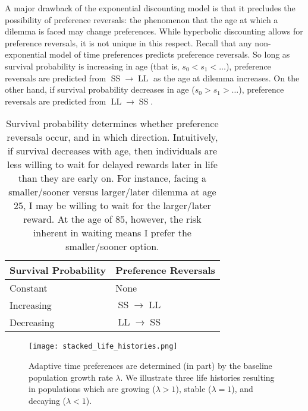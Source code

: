 \documentclass[titlepage, hidelinks, 12pt]{article}
\theoremstyle{plain}
\theoremstyle{remark}
\theoremstyle{definition}
\DeclareMathOperator{\smallersooner}{SS}
\DeclareMathOperator{\largerlater}{LL}
\begin{document}
A major drawback of the exponential discounting model is that it precludes the possibility of preference reversals: the phenomenon that the
age at which a dilemma is faced may change preferences. While hyperbolic discounting allows for preference reversals, it is not unique in 
this respect. Recall that any
non-exponential model of time preferences predicts preference reversals. 
So long as survival probability is increasing in age (that is, $s_0 < s_1 < \ldots$), preference reversals are predicted from $\smallersooner\to
\largerlater$ as the age at dilemma increases. On the other hand, if survival probability decreases in age ($s_0 > s_1 > \ldots$), preference reversals are 
predicted from $\largerlater\to\smallersooner$. 

\begin{table}[h]
    \centering
\begin{tabular}{|l|l|}
    \hline
Survival Probability & Preference Reversals            \\ \hline \hline
Constant             & None                            \\
Increasing           & $\smallersooner\to\largerlater$ \\
Decreasing           & $\largerlater\to\smallersooner$ \\ \hline
\end{tabular}
\caption[Association between survival probability and type of preference reversals.]{Survival probability determines whether preference reversals occur, and in which direction. Intuitively, if survival 
decreases with age, then individuals are less willing to wait for delayed rewards later in life than they are early on. For instance,
facing a smaller/sooner versus larger/later dilemma at age $25$, I may be willing to wait for the larger/later reward. At the age of
$85$, however, the risk inherent in waiting means I prefer the smaller/sooner option.}
\end{table}







\begin{figure}[H]
    \centering
    \texttt{[image: stacked\_life\_histories.png]}
    \caption[Life histories giving decaying, stable, and growing populations.]{Adaptive time preferences are determined (in part) by the baseline population growth rate $\lambda$. 
        We illustrate three life histories resulting in populations which are
        growing ($\lambda > 1$), stable ($\lambda = 1$), and decaying ($\lambda < 1$).}
\end{figure}
\newpage
\end{document}
